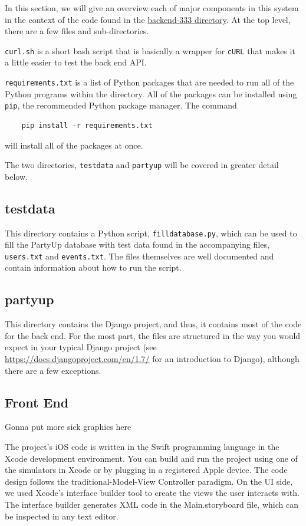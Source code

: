 \documentclass[12pt]{article}
\begin{document}
In this section, we will give an overview each of major components in this system
in the context of the code found in the
\href{https://github.com/BDGL-Hacks/backend-333}{backend-333 directory}.
At the top level, there are a few files and sub-directories.

\texttt{curl.sh} is a short bash script that is basically a wrapper for 
\texttt{cURL} that makes it a little easier to test the back end API.

\texttt{requirements.txt} is a list of Python packages that are needed to
run all of the Python programs within the directory.
All of the packages can be installed using \texttt{pip}, the recommended
Python package manager.
The command
\begin{lstlisting}
    pip install -r requirements.txt
\end{lstlisting}
will install all of the packages at once.

The two directories, \texttt{testdata} and \texttt{partyup} will be covered
in greater detail below.

\subsection{testdata}

This directory contains a Python script, \texttt{filldatabase.py},
which can be used to fill the PartyUp database with test data
found in the accompanying files, \texttt{users.txt} and \texttt{events.txt}.
The files themselves are well documented and contain information about
how to run the script.

\subsection{partyup}

This directory contains the Django project, and thus,
it contains most of the code for the back end.
For the most part, the files are structured in the way you would
expect in your typical Django project
(see \url{https://docs.djangoproject.com/en/1.7/} for an introduction to Django),
although there are a few exceptions.

\subsection{Front End}

Gonna put more sick graphics here

The project's iOS code is written in the Swift programming language in the Xcode development environment. You can build and run the project using one of the simulators in Xcode or by plugging in a registered Apple device. The code design follows the traditional-Model-View Controller paradigm. On the UI side, we used Xcode's interface builder tool to create the views the user interacts with. The interface builder generates XML code in the Main.storyboard file, which can be inspected in any text editor.
\end{document}
